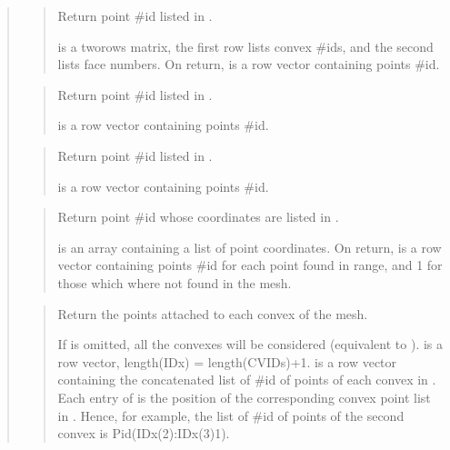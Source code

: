 \documentclass[a4paper,11pt,english]{sphinxmanual}
\begin{document}
\begin{quote}
\begin{quote}

Return point \#id listed in .

 is a two\sphinxhyphen{}rows matrix, the first row lists convex \#ids,
and the second lists face numbers. On return,  is a
row vector containing points \#id.
\end{quote}

\begin{quote}

Return point \#id listed in .

 is a row vector containing points \#id.
\end{quote}

\begin{quote}

Return point \#id listed in .

 is a row vector containing points \#id.
\end{quote}

\begin{quote}

Return point \#id whose coordinates are listed in .

 is an array containing a list of point coordinates. On
return,  is a row vector containing points
\#id for each point found in  range, and \sphinxhyphen{}1 for those
which where not found in the mesh.
\end{quote}

\begin{quote}

Return the points attached to each convex of the mesh.

If  is omitted, all the convexes will be considered
(equivalent to ).  is a
row vector, length(IDx) = length(CVIDs)+1.  is a
row vector containing the concatenated list of \#id of
points of each convex in . Each entry of  is the
position of the corresponding convex point list in . Hence,
for example, the list of \#id of points of the second convex is
Pid(IDx(2):IDx(3)\sphinxhyphen{}1).


\end{quote}
\end{quote}
\end{document}
